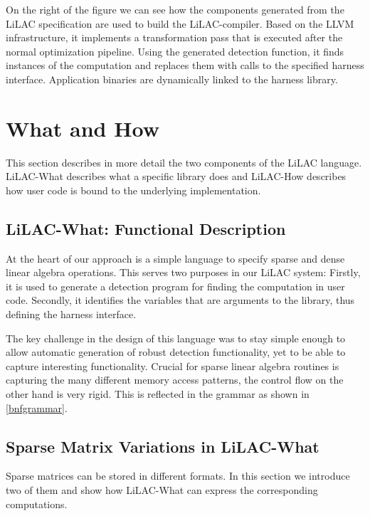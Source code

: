 On the right of the figure we can see how the components generated from the
LiLAC specification are used to build the LiLAC-compiler.
Based on the LLVM infrastructure, it implements a transformation pass that
is executed after the normal optimization pipeline.
Using the generated detection function, it finds instances of the computation
and replaces them with calls to the specified harness interface.
Application binaries are dynamically linked to the harness library.

\section{What and How}

This section describes in more detail the two components of the LiLAC language.
LiLAC-What describes what a specific library does and LiLAC-How describes how
user code is bound to the underlying implementation.

\subsection{LiLAC-What: Functional Description}
At the heart of our approach is a simple language to specify sparse and dense
linear algebra operations.
This serves two purposes in our LiLAC system: Firstly, it is used to generate
a detection program for finding the computation in user code.
Secondly, it identifies the variables that are arguments to the library, thus
defining the harness interface.

The key challenge in the design of this language was to stay simple enough
to allow automatic generation of robust detection functionality, yet to be able
to capture interesting functionality.
Crucial for sparse linear algebra routines is capturing the many different
memory access patterns, the control flow on the other hand is very rigid.
This is reflected in the grammar as shown in \autoref{bnfgrammar}.

\subsection{Sparse Matrix Variations in LiLAC-What}
Sparse matrices can be stored in different formats.
In this section we introduce two of them and show how LiLAC-What can express
the corresponding computations.

